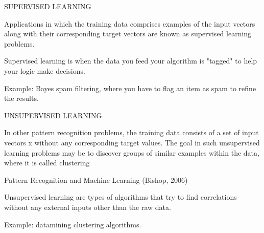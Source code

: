 \documentclass[PredictiveAnalytics101.tex]{subfiles}
\begin{document}
 
	\begin{frame}
SUPERVISED LEARNING

Applications in which the training data comprises examples of the input vectors along with their corresponding target vectors are known as supervised learning problems.

Supervised learning is when the data you feed your algorithm is "tagged" to help your logic make decisions.

Example: Bayes spam filtering, where you have to flag an item as spam to refine the results.

\end{frame}
\begin{frame}


UNSUPERVISED LEARNING

In other pattern recognition problems, the training data consists of a set of input vectors x without any corresponding target values. The goal in such unsupervised learning problems may be to discover groups of similar examples within the data, where it is called clustering

Pattern Recognition and Machine Learning (Bishop, 2006)

Unsupervised learning are types of algorithms that try to find correlations without any external inputs other than the raw data.

Example: datamining clustering algorithms.
	\end{frame}
	
\end{document}
